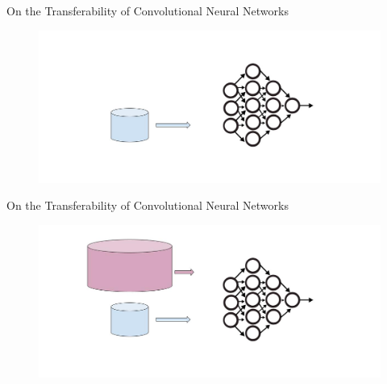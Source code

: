 \documentclass{beamer}
\begin{document}
\begin{frame}{On the Transferability of Convolutional Neural Networks}
	\bigskip

	\begin{figure}
		\includegraphics[width=1.2\textwidth]{figures/tl__}
	\end{figure}
	 
\end{frame}

\begin{frame}{On the Transferability of Convolutional Neural Networks}
	\bigskip

	\begin{figure}
		\includegraphics[width=1.2\textwidth]{figures/tl___}
	\end{figure}
	 
\end{frame}

\end{document}
